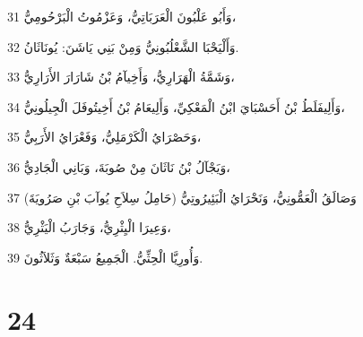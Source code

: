 \par 31 وَأَبُو عَلْبُونَ الْعَرَبَاتِيُّ، وَعَزْمُوتُ الْبَرْحُومِيُّ،
\par 32 وَأَلْيَحْبَا الشَّعْلُبُونِيُّ وَمِنْ بَنِي يَاشَنَ: يُونَاثَانُ.
\par 33 وَشَمَّةُ الْهَرَارِيُّ، وَأَخِيآمُ بْنُ شَارَارَ الأَرَارِيُّ،
\par 34 وَأَلِيفَلَطُ بْنُ أَحَسْبَايَ ابْنُ الْمَعْكِيِّ، وَأَلِيعَامُ بْنُ أَخِيتُوفَلَ الْجِيلُونِيُّ،
\par 35 وَحَصْرَايُ الْكَرْمَلِيُّ، وَفَعْرَايُ الأَرَبِيُّ،
\par 36 وَيَجْآلُ بْنُ نَاثَانَ مِنْ صُوبَةَ، وَبَانِي الْجَادِيُّ،
\par 37 وَصَالَقُ الْعَمُّونِيُّ، وَنَحْرَايُ الْبَئِيرُوتِيُّ (حَامِلُ سِلاَحِ يُوآبَ بْنِ صَرُويَةَ)
\par 38 وَعِيرَا الْيِثْرِيُّ، وَجَارَبُ الْيَثْرِيُّ،
\par 39 وَأُورِيَّا الْحِثِّيُّ. الْجَمِيعُ سَبْعَةٌ وَثَلاَثُونَ.

\chapter{24}

